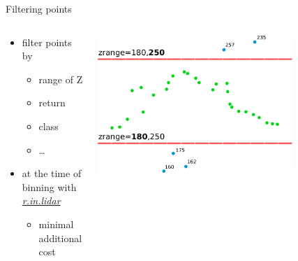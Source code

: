 \documentclass[xcolor={dvipsnames,usenames},beamer,aspectratio=169]{beamer}
\newcommand{\gmodule}[1]{\href{http://grass.osgeo.org/grass71/manuals/#1.html}{\emph{#1}}}
\begin{document}
\begin{frame}{Filtering points}

\begin{columns}
\begin{column}{0.38\textwidth}

 \begin{itemize}
  \item filter points by
  \begin{itemize}
    \item range of Z
    \item return
    \item class
    \item \ldots
  \end{itemize}
  \item at the time of binning with \gmodule{r.in.lidar}
    \begin{itemize}
    \item minimal additional cost
    \end{itemize}
\end{itemize}

\end{column}
\begin{column}{0.6\textwidth}

\begin{center}
  \includegraphics[width=0.75\textwidth]{features/zrange}
\end{center}

\end{column}
\end{columns}

\end{frame}
\end{document}
